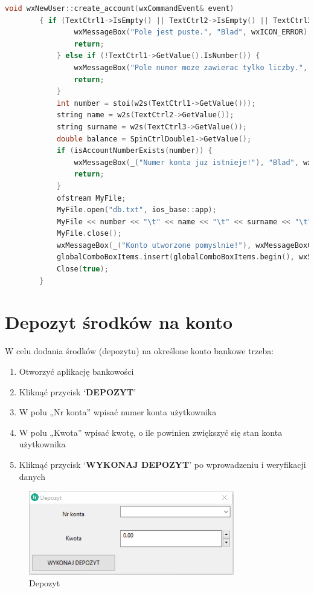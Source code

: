 \documentclass[a4paper,12pt]{article}
\begin{document}
	\begin{lstlisting}[language=C++]
void wxNewUser::create_account(wxCommandEvent& event)
		{ if (TextCtrl1->IsEmpty() || TextCtrl2->IsEmpty() || TextCtrl3->IsEmpty()) {
				wxMessageBox("Pole jest puste.", "Blad", wxICON_ERROR);
				return;
			} else if (!TextCtrl1->GetValue().IsNumber()) {
				wxMessageBox("Pole numer moze zawierac tylko liczby.", "Blad", wxICON_ERROR);
				return;
			}
			int number = stoi(w2s(TextCtrl1->GetValue()));
			string name = w2s(TextCtrl2->GetValue());
			string surname = w2s(TextCtrl3->GetValue());
			double balance = SpinCtrlDouble1->GetValue();
			if (isAccountNumberExists(number)) {
				wxMessageBox(_("Numer konta juz istnieje!"), "Blad", wxICON_ERROR);
				return;
			}
			ofstream MyFile;
			MyFile.open("db.txt", ios_base::app);
			MyFile << number << "\t" << name << "\t" << surname << "\t" << balance << "\n";
			MyFile.close();
			wxMessageBox(_("Konto utworzone pomyslnie!"), wxMessageBoxCaptionStr, wxICON_INFORMATION);
			globalComboBoxItems.insert(globalComboBoxItems.begin(), wxString::Format("%d", number));
			Close(true);
		}
	\end{lstlisting}
\newpage
	\section{Depozyt środków na konto}
	W celu dodania środków (depozytu) na określone konto bankowe trzeba:
	\begin{enumerate}
		\item Otworzyć aplikację bankowości
		\item Kliknąć przycisk ‘\textbf{DEPOZYT}’
		\item W polu „Nr konta” wpisać numer konta użytkownika
		\item W polu „Kwota” wpisać kwotę, o ile powinien zwiększyć się stan konta użytkownika
		\item Kliknąć przycisk ‘\textbf{WYKONAJ DEPOZYT}’ po wprowadzeniu i weryfikacji danych 
	\end{enumerate}
\begin{figure}[h]
	\centering
	\includegraphics[width=0.8\textwidth]{depozyt.png}
	\caption{Depozyt}
	\label{depozyt}
\end{figure}
\newpage
\end{document}
